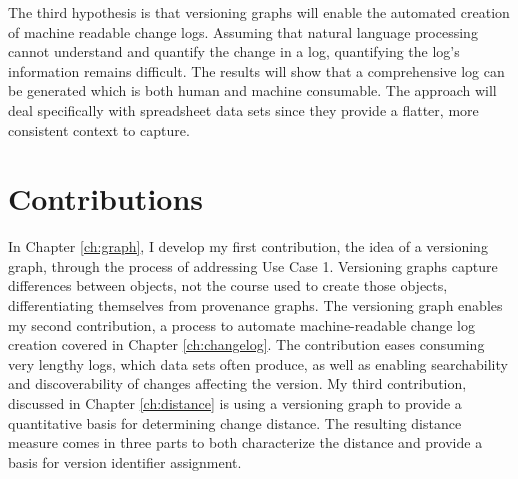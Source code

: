 The third hypothesis is that versioning graphs will enable the automated creation of machine readable change logs.
Assuming that natural language processing cannot understand and quantify the change in a log, quantifying the log's information remains difficult.
The results will show that a comprehensive log can be generated which is both human and machine consumable.
The approach will deal specifically with spreadsheet data sets since they provide a flatter, more consistent context to capture.

\section{Contributions}


In Chapter \ref{ch:graph}, I develop my first contribution, the idea of a versioning graph, through the process of addressing Use Case 1.
Versioning graphs capture differences between objects, not the course used to create those objects, differentiating themselves from provenance graphs.
The versioning graph enables my second contribution, a process to automate machine-readable change log creation covered in Chapter \ref{ch:changelog}.
The contribution eases consuming very lengthy logs, which data sets often produce, as well as enabling searchability and discoverability of changes affecting the version.
My third contribution, discussed in Chapter \ref{ch:distance} is using a versioning graph to provide a quantitative basis for determining change distance.
The resulting distance measure comes in three parts to both characterize the distance and provide a basis for version identifier assignment.

